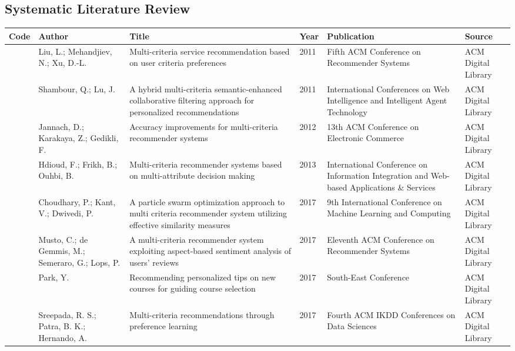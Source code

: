 \cleardoublepage
\begin{landscape}
\chapter{Systematic Literature Review}
\label{chap:studies-slr}

\footnotesize
\setlength{\tabulinesep}{3pt}
\begin{longtabu} to 
\toprule
Code & Author & Title & Year & Publication & Source \\ \midrule
\endhead
\bottomrule
\endfoot
{} & Liu, L.; Mehandjiev, N.; Xu, D.-L. & Multi-criteria service recommendation based on user criteria preferences & 2011 & Fifth ACM Conference on Recommender Systems & ACM Digital Library \\
 & Shambour, Q.; Lu, J. & A hybrid multi-criteria semantic-enhanced collaborative filtering approach for personalized recommendations & 2011 & International Conferences on Web Intelligence and Intelligent Agent Technology & ACM Digital Library \\
 & Jannach, D.; Karakaya, Z.; Gedikli, F. & Accuracy improvements for multi-criteria recommender systems & 2012 & 13th ACM Conference on Electronic Commerce & ACM Digital Library \\
 & Hdioud, F.; Frikh, B.; Ouhbi, B. & Multi-criteria recommender systems based on multi-attribute decision making & 2013 & International Conference on Information Integration and Web-based Applications \& Services & ACM Digital Library \\
 & Choudhary, P.; Kant, V.; Dwivedi, P. & A particle swarm optimization approach to multi criteria recommender system utilizing effective similarity measures & 2017 & 9th International Conference on Machine Learning and Computing & ACM Digital Library \\
 & Musto, C.; de Gemmis, M.; Semeraro, G.; Lops, P. & A multi-criteria recommender system exploiting aspect-based sentiment analysis of users' reviews & 2017 & Eleventh ACM Conference on Recommender Systems & ACM Digital Library \\
 & Park, Y. & Recommending personalized tips on new courses for guiding course selection & 2017 & South-East Conference & ACM Digital Library \\
 & Sreepada, R. S.; Patra, B. K.; Hernando, A. & Multi-criteria recommendations through preference learning & 2017 & Fourth ACM IKDD Conferences on Data Sciences & ACM Digital Library \\

\end{longtabu}
\end{landscape}
